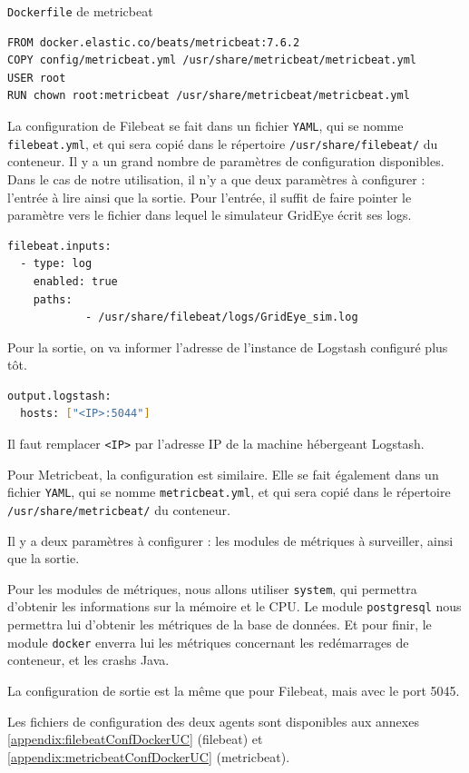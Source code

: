 \documentclass[paper=a4, fontsize=11pt]{scrartcl}
\begin{document}
\verb,Dockerfile, de metricbeat
\begin{lstlisting}
FROM docker.elastic.co/beats/metricbeat:7.6.2
COPY config/metricbeat.yml /usr/share/metricbeat/metricbeat.yml
USER root
RUN chown root:metricbeat /usr/share/metricbeat/metricbeat.yml
\end{lstlisting}

La configuration de Filebeat se fait dans un fichier \verb,YAML,, qui se nomme \verb,filebeat.yml,, et qui sera copié dans le répertoire \verb,/usr/share/filebeat/, du conteneur. Il y a un grand nombre de paramètres de configuration disponibles. Dans le cas de notre utilisation, il n'y a que deux paramètres à configurer : l'entrée à lire ainsi que la sortie.
Pour l'entrée, il suffit de faire pointer le paramètre vers le fichier dans lequel le simulateur GridEye écrit ses logs.
\begin{lstlisting}[language=bash]
filebeat.inputs:
  - type: log
    enabled: true
    paths:
            - /usr/share/filebeat/logs/GridEye_sim.log
\end{lstlisting}
Pour la sortie, on va informer l'adresse de l'instance de Logstash configuré plus tôt.
\begin{lstlisting}[language=bash]
output.logstash:
  hosts: ["<IP>:5044"]
\end{lstlisting}
Il faut remplacer \verb,<IP>, par l'adresse IP de la machine hébergeant Logstash.

Pour Metricbeat, la configuration est similaire. Elle se fait également dans un fichier \verb,YAML,, qui se nomme \verb,metricbeat.yml,, et qui sera copié dans le répertoire \verb,/usr/share/metricbeat/, du conteneur.

Il y a deux paramètres à configurer : les modules de métriques à surveiller, ainsi que la sortie.

Pour les modules de métriques, nous allons utiliser \verb,system,, qui permettra d'obtenir les informations sur la mémoire et le CPU. Le module \verb,postgresql, nous permettra lui d'obtenir les métriques de la base de données. Et pour finir, le module \verb,docker, enverra lui les métriques concernant les redémarrages de conteneur, et les crashs Java.

La configuration de sortie est la même que pour Filebeat, mais avec le port 5045.

Les fichiers de configuration des deux agents sont disponibles aux annexes \ref{appendix:filebeatConfDockerUC} (filebeat) et \ref{appendix:metricbeatConfDockerUC} (metricbeat).
\end{document}
